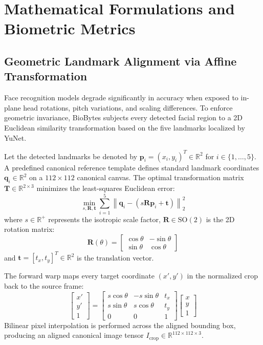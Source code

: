 \documentclass[12pt,a4paper,oneside]{report}
\begin{document}
\chapter{Mathematical Formulations and Biometric Metrics}

\section{Geometric Landmark Alignment via Affine Transformation}
Face recognition models degrade significantly in accuracy when exposed to in-plane head rotations, pitch variations, and scaling differences. To enforce geometric invariance, BioBytes subjects every detected facial region to a 2D Euclidean similarity transformation based on the five landmarks localized by YuNet.

Let the detected landmarks be denoted by $\mathbf{p}_i = (x_i, y_i)^T \in \mathbb{R}^2$ for $i \in \{1, \dots, 5\}$. A predefined canonical reference template defines standard landmark coordinates $\mathbf{q}_i \in \mathbb{R}^2$ on a $112 \times 112$ canonical canvas. The optimal transformation matrix $\mathbf{T} \in \mathbb{R}^{2 \times 3}$ minimizes the least-squares Euclidean error:
\begin{equation}
\min_{s, \mathbf{R}, \mathbf{t}} \sum_{i=1}^{5} \left\| \mathbf{q}_i - \left( s \mathbf{R} \mathbf{p}_i + \mathbf{t} \right) \right\|_2^2
\end{equation}
where $s \in \mathbb{R}^+$ represents the isotropic scale factor, $\mathbf{R} \in \text{SO}(2)$ is the 2D rotation matrix:
\begin{equation}
\mathbf{R}(\theta) = \begin{bmatrix} \cos\theta & -\sin\theta \\ \sin\theta & \cos\theta \end{bmatrix}
\end{equation}
and $\mathbf{t} = [t_x, t_y]^T \in \mathbb{R}^2$ is the translation vector.

The forward warp maps every target coordinate $(x', y')$ in the normalized crop back to the source frame:
\begin{equation}
\begin{bmatrix} x' \\ y' \\ 1 \end{bmatrix} = \begin{bmatrix} s\cos\theta & -s\sin\theta & t_x \\ s\sin\theta & s\cos\theta & t_y \\ 0 & 0 & 1 \end{bmatrix} \begin{bmatrix} x \\ y \\ 1 \end{bmatrix}
\end{equation}
Bilinear pixel interpolation is performed across the aligned bounding box, producing an aligned canonical image tensor $I_{\text{crop}} \in \mathbb{R}^{112 \times 112 \times 3}$.
\end{document}
